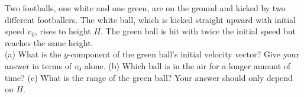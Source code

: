 Two footballs, one white and one green, are on the ground and kicked
by two different footballers. The white ball, which is kicked
straight upward with initial speed $v_0$, rises to height $H$. The green ball is
hit with twice the initial speed but reaches the same height.\\
%
(a) What is the $y$-component of the green ball's initial
velocity vector? Give your answer in terms of $v_0$ alone.\answercheck\hwendpart
%
(b) Which ball is in the air for a longer amount of time?\hwendpart
%
(c) What is the range of the green ball? Your answer should only
depend on $H$.\answercheck
